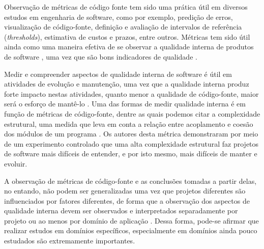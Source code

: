 
Observação de métricas de código fonte tem sido uma prática útil em diversos
estudos em engenharia de software, como por exemplo, predição de erros,
visualização de código-fonte, definição e avaliação de intervalos de referência
({\it thresholds}), estimativa de custos e prazos, entre outros.  Métricas tem
sido útil ainda como uma maneira efetiva de se observar a qualidade interna de
produtos de software \cite{Meirelles2013}, uma vez que são bons indicadores de
qualidade \cite{Basili1996}.


Medir e compreender aspectos de qualidade interna de software é útil em
atividades de evolução e manutenção, uma vez que a qualidade interna produz
forte impacto nestas atividades, quanto menor a qualidade de código-fonte,
maior será o esforço de mantê-lo \cite{Terceiro2010}. Uma das formas de medir
qualidade interna é em função de métricas de código-fonte, dentre as quais
podemos citar a complexidade estrutural, uma medida que leva em conta a relação
entre acoplamento e coesão dos módulos de um programa \cite{Darcy2005}. Os
autores desta métrica demonstraram por meio de um experimento controlado que
uma alta complexidade estrutural faz projetos de software mais difíceis de
entender, e por isto mesmo, mais difíceis de manter e evoluir.

%

A observação de métricas de código-fonte e as conclusões tomadas a partir
delas, no entando, não podem ser generalizadas uma vez que projetos diferentes
são influenciados por fatores diferentes, de forma que a observação dos
aspectos de qualidade interna devem ser observados e interpretados
separadamente por projeto \cite{Terceiro2012Understanding} ou ao menos por
domínio de aplicação \cite{Meirelles2013}. Dessa forma, pode-se afirmar que
realizar estudos em domínios específicos, especialmente em domínios ainda pouco
estudados são extremamente importantes.


